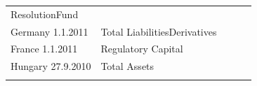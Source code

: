 \documentclass[]{tufte-handout}
\begin{document}
\begin{longtable}[]{@{}lllll@{}}
\begin{minipage}[t]{0.17\columnwidth}
ResolutionFund\strut
\end{minipage}\tabularnewline
\begin{minipage}[t]{0.17\columnwidth}\raggedright
Germany 1.1.2011\strut
\end{minipage} & \begin{minipage}[t]{0.17\columnwidth}\raggedright
Total LiabilitiesDerivatives\strut
\end{minipage} & \begin{minipage}[t]{0.17\columnwidth}\raggedright
\strut
\end{minipage} & \begin{minipage}[t]{0.17\columnwidth}\raggedright
\strut
\end{minipage} & \begin{minipage}[t]{0.17\columnwidth}\raggedright
\strut
\end{minipage}\tabularnewline
\begin{minipage}[t]{0.17\columnwidth}\raggedright
France 1.1.2011\strut
\end{minipage} & \begin{minipage}[t]{0.17\columnwidth}\raggedright
Regulatory Capital\strut
\end{minipage} & \begin{minipage}[t]{0.17\columnwidth}\raggedright
\strut
\end{minipage} & \begin{minipage}[t]{0.17\columnwidth}\raggedright
\strut
\end{minipage} & \begin{minipage}[t]{0.17\columnwidth}\raggedright
\strut
\end{minipage}\tabularnewline
\begin{minipage}[t]{0.17\columnwidth}\raggedright
Hungary 27.9.2010\strut
\end{minipage} & \begin{minipage}[t]{0.17\columnwidth}\raggedright
Total Assets\strut
\end{minipage} & \begin{minipage}[t]{0.17\columnwidth}\raggedright
\strut
\end{minipage} & \begin{minipage}[t]{0.17\columnwidth}\raggedright
\strut
\end{minipage} & \begin{minipage}[t]{0.17\columnwidth}\raggedright
\strut
\end{minipage}\tabularnewline
\begin{minipage}[t]{0.17\columnwidth}\raggedright

\end{minipage}
\end{longtable}
\end{document}

